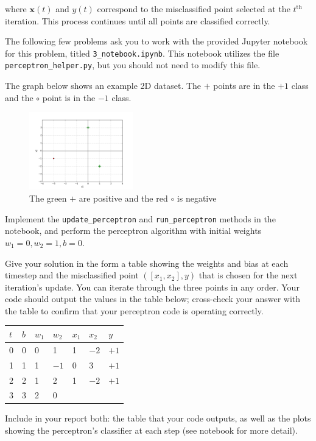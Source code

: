 where $\mathbf{x}(t)$ and $y(t)$ correspond to the misclassified point selected at the $t^\text{th}$ iteration.
This process continues until all points are classified correctly.

The following few problems ask you to work with the provided Jupyter notebook for this problem, titled \texttt{3_notebook.ipynb}. This notebook utilizes the file \texttt{perceptron_helper.py}, but you should not need to modify this file.

\begin{problem}[8]
The graph below shows an example 2D dataset.
The $+$ points are in the $+1$ class and the $\circ$ point is in the $-1$ class.

\begin{figure}[H]
	\centering
	\includegraphics[width=0.4\textwidth]{images/perceptron.png}
	\caption{The green $+$ are positive and the red $\circ$ is negative}
	\label{fig:figure1}
\end{figure}

Implement the \texttt{update_perceptron} and \texttt{run_perceptron} methods in the notebook, and perform the perceptron algorithm with initial weights $w_1 = 0, w_2 = 1, b = 0$.

Give your solution in the form a table showing the weights and bias at each timestep and the misclassified point $([x_1,x_2],y)$ that is chosen for the next iteration's update. You can iterate through the three points in any order. Your code should output the values in the table below; cross-check your answer with the table to confirm that your perceptron code is operating correctly.

\begin{table}[H]
	\centering

	\begin{tabular}{l|lll|ll|l}
		\hline

		\hline
		$t$ & $b$ & $w_1$ & $w_2$ & $x_1$ & $x_2$ & $y$  \\
		\hline
		0   & 0   & 0     & 1     & 1     & $-2$  & $+1$ \\
		1   & 1   & 1     & $-1$  & 0     & 3     & $+1$ \\
		2   & 2   & 1     & 2     & 1     & $-2$  & $+1$ \\
		3   & 3   & 2     & 0                            \\
		\hline
	\end{tabular}
\end{table}

Include in your report both: the table that your code outputs, as well as the plots showing the perceptron's classifier at each step (see notebook for more detail).


\end{problem}
